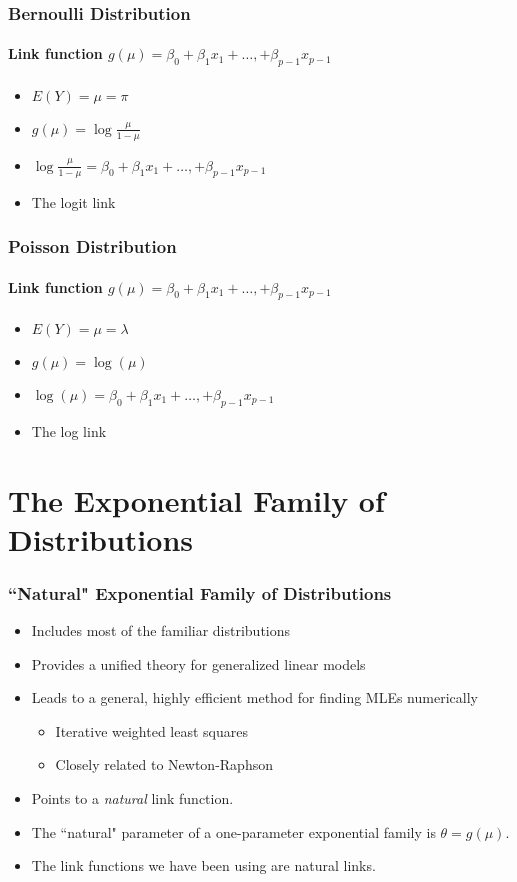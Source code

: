 \documentclass[serif]{beamer} %
\begin{document}
\begin{frame}
\frametitle{Bernoulli Distribution}
\framesubtitle{Link function $g(\mu) = \beta_0 + \beta_1 x_1 + \ldots, + \beta_{p-1}x_{p-1}$} 
  \begin{itemize}
    \item $E(Y)=\mu=\pi$
    \item $g(\mu) = \log \frac{\mu}{1-\mu}$
    \item $\log \frac{\mu}{1-\mu} =  \beta_0 + \beta_1 x_1 + \ldots, + \beta_{p-1}x_{p-1}$
    \item The logit link
  \end{itemize}
\end{frame}

\begin{frame}
\frametitle{Poisson Distribution}
\framesubtitle{Link function $g(\mu) = \beta_0 + \beta_1 x_1 + \ldots, + \beta_{p-1}x_{p-1}$} 
  \begin{itemize}
    \item $E(Y)=\mu=\lambda$
    \item $g(\mu) = \log(\mu)$
    \item $\log(\mu) = \beta_0 + \beta_1 x_1 + \ldots, + \beta_{p-1}x_{p-1}$
    \item The log link
  \end{itemize}
\end{frame}


\section{The Exponential Family of Distributions} %

\begin{frame}
\frametitle{``Natural" Exponential Family of Distributions}
  \begin{itemize}
    \item Includes most of the familiar distributions
    \item Provides a unified theory for generalized linear models
    \item Leads to a general, highly efficient method for finding MLEs numerically
        \begin{itemize}
            \item Iterative weighted least squares
            \item Closely related to Newton-Raphson
        \end{itemize}
    \item Points to a \emph{natural} link function.
    \item The ``natural" parameter of a one-parameter exponential family is $\theta=g(\mu)$.
    \item The link functions we have been using are natural links.
  \end{itemize}
\end{frame}
\end{document}
